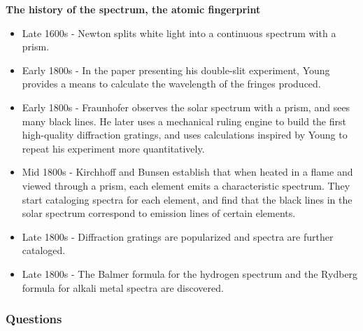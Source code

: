 \documentclass{article}
\begin{document}
\textbf{The history of the spectrum, the atomic fingerprint}
\begin{itemize}
	\item Late 1600s - Newton splits white light into a continuous spectrum with a prism.
	\item Early 1800s - In the paper presenting his double-slit experiment, Young provides a means to calculate the wavelength of the fringes produced.
	\item Early 1800s - Fraunhofer observes the solar spectrum with a prism, and sees many black lines. He later uses a mechanical ruling engine to build the first high-quality diffraction gratings, and uses calculations inspired by Young to repeat his experiment more quantitatively.
	\item Mid 1800s - Kirchhoff and Bunsen establish that when heated in a flame and viewed through a prism, each element emits a characteristic spectrum. They start cataloging spectra for each element, and find that the black lines in the solar spectrum correspond to emission lines of certain elements.
	\item Late 1800s - Diffraction gratings are popularized and spectra are further cataloged.
	\item Late 1800s - The Balmer formula for the hydrogen spectrum and the Rydberg formula for alkali metal spectra are discovered.
\end{itemize}

\subsubsection*{Questions}
\end{document}
